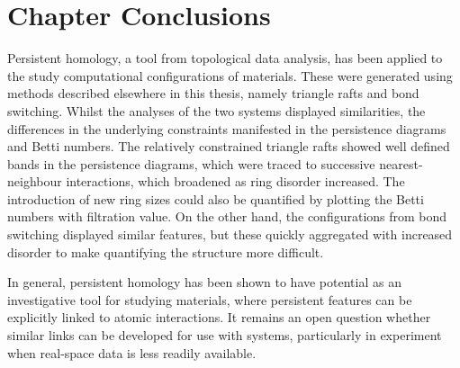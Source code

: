\section{Chapter Conclusions}

Persistent homology, a tool from topological data analysis, has been applied to the study computational configurations of \td{} materials.
These were generated using methods described elsewhere in this thesis, namely triangle rafts and bond switching.
Whilst the analyses of the two systems displayed similarities, the differences in the underlying constraints manifested in the persistence diagrams and Betti numbers.
The relatively constrained triangle rafts showed well defined bands in the persistence diagrams, which were traced to successive nearest\--neighbour interactions, which broadened as ring disorder increased.
The introduction of new ring sizes could also be quantified by plotting the Betti numbers with filtration value.
On the other hand, the configurations from bond switching displayed similar features, but these quickly aggregated with increased disorder to make quantifying the structure more difficult.

In general, persistent homology has been shown to have potential as an investigative tool for studying \td{} materials, where persistent features can be explicitly linked to atomic interactions.
It remains an open question whether similar links can be developed for use with \thd{} systems, particularly in experiment when real\--space data is less readily available.
